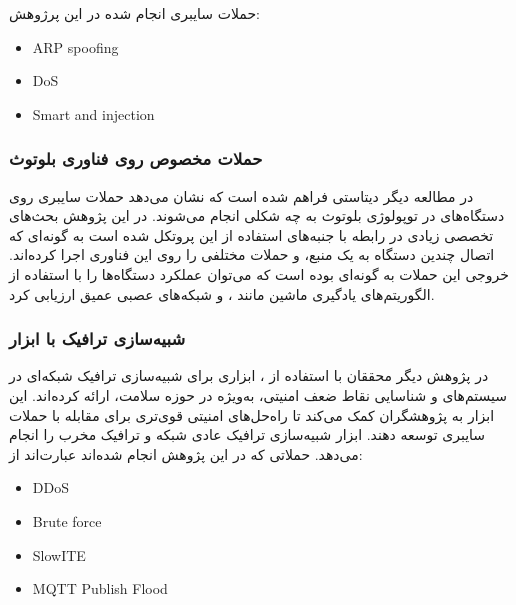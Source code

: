 حملات سایبری انجام شده در این پرژوهش:

\begin{LTR}
    \begin{itemize}
        \item ARP spoofing
        \item DoS
        \item Smart and injection
    \end{itemize}
\end{LTR}

\subsubsection{حملات مخصوص روی فناوری بلوتوث}

در مطالعه دیگر \cite{zubair2022secure,skhs-0b39-21} دیتاستی فراهم شده است که
نشان می‌دهد حملات سایبری روی دستگاه‌های  در توپولوژی بلوتوث به چه شکلی
انجام می‌شوند. در این پژوهش بحث‌های تخصصی زیادی در رابطه با جنبه‌های استفاده از
این پروتکل شده است به گونه‌ای که اتصال چندین دستگاه به یک منبع، و حملات مختلفی
را روی این فناوری اجرا کرده‌اند. خروجی این حملات به گونه‌ای بوده است که می‌توان
عملکرد دستگاه‌ها را با استفاده از الگوریتم‌های یادگیری ماشین مانند ،  و شبکه‌های عصبی عمیق ارزیابی کرد.

\subsubsection{شبیه‌سازی ترافیک با ابزار }

در پژوهش دیگر \cite{hussain2021framework} محققان با استفاده از ،
ابزاری برای شبیه‌سازی ترافیک شبکه‌ای در سیستم‌های  و شناسایی نقاط ضعف
امنیتی، به‌ویژه در حوزه سلامت، ارائه کرده‌اند.  این ابزار به پژوهشگران کمک
می‌کند تا راه‌حل‌های امنیتی قوی‌تری برای مقابله با حملات سایبری توسعه دهند.
ابزار  شبیه‌سازی ترافیک عادی شبکه و ترافیک مخرب را انجام می‌دهد.
حملاتی که در این پژوهش انجام شده‌اند عبارت‌اند از:

\begin{LTR}
    \begin{itemize}
        \item DDoS
        \item Brute force
        \item SlowITE
        \item MQTT Publish Flood
    \end{itemize}
\end{LTR}

